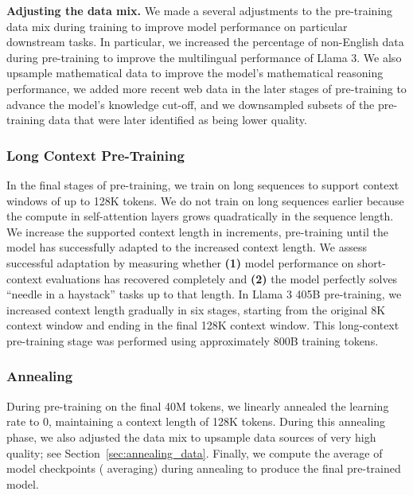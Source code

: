 \textbf{Adjusting the data mix.} We made a several adjustments to the pre-training data mix during training to improve model performance on particular downstream tasks. In particular, we increased the percentage of non-English data during pre-training to improve the multilingual performance of Llama 3. We also upsample mathematical data to improve the model's mathematical reasoning performance, we added more recent web data in the later stages of pre-training to advance the model's knowledge cut-off, and we downsampled subsets of the pre-training data that were later identified as being lower quality.

\subsubsection{Long Context Pre-Training} In the final stages of pre-training, we train on long sequences to support context windows of up to 128K tokens. We do not train on long sequences earlier because the compute in self-attention layers grows quadratically in the sequence length. We increase the supported context length in increments, pre-training until the model has successfully adapted to the increased context length. We assess successful adaptation by measuring whether \textbf{(1)} model performance on short-context evaluations has recovered completely and \textbf{(2)} the model perfectly solves ``needle in a haystack'' tasks up to that length. In Llama 3 405B pre-training, we increased context length gradually in six stages, starting from the original 8K context window and ending in the final 128K context window. This long-context pre-training stage was performed using approximately 800B training tokens.

\subsubsection{Annealing} 
\label{section:annealing}

During pre-training on the final 40M tokens, we linearly annealed the learning rate to 0, maintaining a context length of 128K tokens. During this annealing phase, we also adjusted the data mix to upsample data sources of very high quality; see Section~\ref{sec:annealing_data}. 
Finally, we compute the average of model checkpoints (\citet{polyak1991averaging} averaging) during annealing to produce the final pre-trained model.

